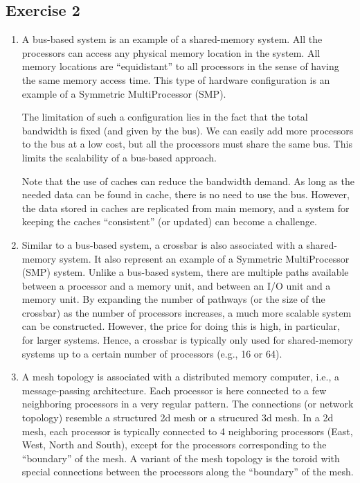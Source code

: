 \documentclass[11pt]{article}
\begin{document}
\subsection*{Exercise 2}
\begin{enumerate}
\item A bus-based system is an example of a shared-memory system.
All the processors can access any physical memory location 
in the system. All memory locations are ``equidistant'' to all processors 
in the sense of having the same memory access time. 
This type of hardware configuration 
is an example of a Symmetric MultiProcessor (SMP). 

The limitation of such a configuration lies in the fact that 
the total bandwidth is fixed (and given by the bus). 
We can easily add more processors to the bus at a low cost, 
but all the processors must share the same bus. 
This limits the scalability of a bus-based approach.

Note that the use of caches can reduce the bandwidth demand.
As long as the needed data can be found in cache, there is 
no need to use the bus. However, the data stored in caches
are replicated from main memory, and a system for keeping the 
caches ``consistent'' (or updated) can become a challenge.

\item Similar to a bus-based system, a crossbar is also 
associated with a shared-memory system. It also represent an
example of a  Symmetric MultiProcessor (SMP) system. 
Unlike a bus-based system, there are multiple paths 
available between a processor and a memory unit,
and between an I/O unit and a memory unit.
By expanding the number of pathways (or the size of the crossbar)
as the number of processors increases, a much more scalable 
system can be constructed. However, the price for doing this 
is high, in particular, for larger systems. Hence, a crossbar 
is typically only used for shared-memory systems up to 
a certain number of processors (e.g., 16 or 64).

\item A mesh topology is associated with a distributed memory 
computer, i.e., a message-passing architecture.
Each processor is here connected to a few neighboring processors
in a very regular pattern. The connections (or network topology)
resemble a structured 2d mesh or a strucured 3d mesh. 
In a 2d mesh, each processor is typically connected to 4 
neighboring processors (East, West, North and South),
except for the processors corresponding to the ``boundary'' 
of the mesh. A variant of the mesh topology is the toroid
with special connections between the processors along the 
``boundary'' of the mesh.


\end{enumerate}
\end{document}

